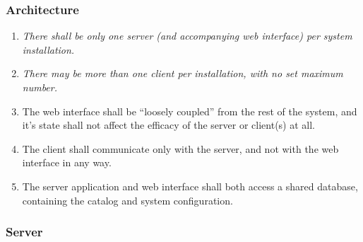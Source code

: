 \subsubsection{Architecture}

\begin{enumerate}
    \item \emph{There shall be only one server (and accompanying web
        interface) per system installation.}
    \item \emph{There may be more than one client per installation,
        with no set maximum number.}
    \item The web interface shall be ``loosely coupled'' from the rest
        of the system, and it's state shall not affect the efficacy of
        the server or client(s) at all.
    \item The client shall communicate only with the server, and not
        with the web interface in any way.
    \item The server application and web interface shall both access
        a shared database, containing the catalog and system
        configuration.
\end{enumerate}

\subsubsection{Server}

